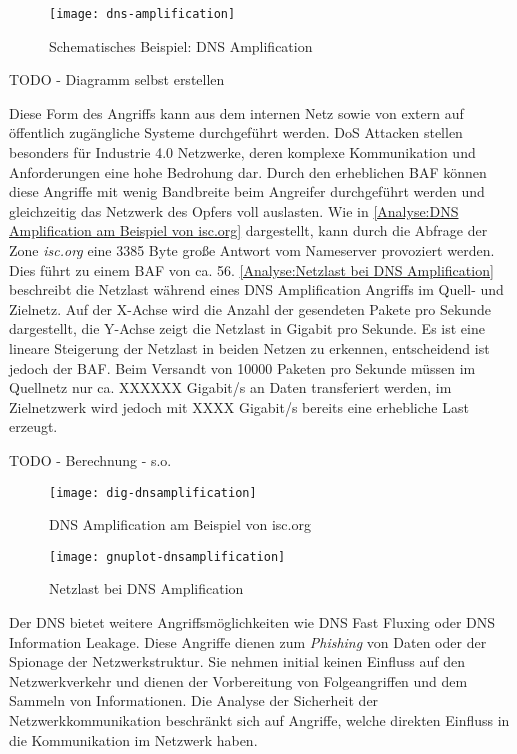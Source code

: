 \begin{figure}[h]
    \centering
    \texttt{[image: dns-amplification]}
    \caption{Schematisches Beispiel: DNS Amplification}
    \label{Analyse:DNS Amplification Example}
  \end{figure}
  
\clearpage

TODO - Diagramm selbst erstellen

Diese Form des Angriffs kann aus dem internen Netz sowie von extern auf öffentlich zugängliche Systeme durchgeführt werden. \ac{DoS} Attacken stellen besonders für Industrie 4.0 Netzwerke, deren komplexe Kommunikation und Anforderungen eine hohe Bedrohung dar. Durch den erheblichen \ac{BAF} können diese Angriffe mit wenig Bandbreite beim Angreifer durchgeführt werden und gleichzeitig das Netzwerk des Opfers voll auslasten. Wie in \autoref{Analyse:DNS Amplification am Beispiel von isc.org} dargestellt, kann durch die Abfrage der Zone \textit{isc.org} eine 3385 Byte große Antwort vom Nameserver provoziert werden. Dies führt zu einem \ac{BAF} von ca. 56. \autoref{Analyse:Netzlast bei DNS Amplification} beschreibt die Netzlast während eines \ac{DNS} Amplification Angriffs im Quell- und Zielnetz. Auf der X-Achse wird die Anzahl der gesendeten Pakete pro Sekunde dargestellt, die Y-Achse zeigt die Netzlast in Gigabit pro Sekunde. Es ist eine lineare Steigerung der Netzlast in beiden Netzen zu erkennen, entscheidend ist jedoch der \ac{BAF}. Beim Versandt von 10000 Paketen pro Sekunde müssen im Quellnetz nur ca. XXXXXX Gigabit/s an Daten transferiert werden, im Zielnetzwerk wird jedoch mit XXXX Gigabit/s bereits eine erhebliche Last erzeugt.

TODO - Berechnung - s.o.

\begin{figure}[h]
    \centering
    \texttt{[image: dig-dnsamplification]}
    \caption{DNS Amplification am Beispiel von isc.org}
    \label{Analyse:DNS Amplification am Beispiel von isc.org}
\end{figure}

\begin{figure}[h]
    \centering
    \texttt{[image: gnuplot-dnsamplification]}
    \caption{Netzlast bei DNS Amplification}
    \label{Analyse:Netzlast bei DNS Amplification}
\end{figure}
  
\clearpage

Der \ac{DNS} bietet weitere Angriffsmöglichkeiten wie \ac{DNS} Fast Fluxing oder \ac{DNS} Information Leakage. Diese Angriffe dienen zum \textit{Phishing} von Daten oder der Spionage der Netzwerkstruktur. Sie nehmen initial keinen Einfluss auf den Netzwerkverkehr und dienen der Vorbereitung von Folgeangriffen und dem Sammeln von Informationen. Die Analyse der Sicherheit der Netzwerkkommunikation beschränkt sich auf Angriffe, welche direkten Einfluss in die Kommunikation im Netzwerk haben.

